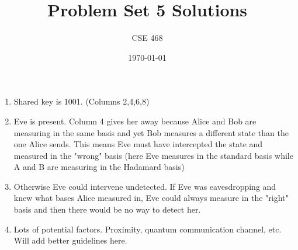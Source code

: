 \documentclass[12pt]{article}
\title{Problem Set 5 Solutions}
\author{CSE 468}
\date{\today}
\begin{document}
\maketitle

\begin{enumerate}[font=\bfseries]
    \item Shared key is 1001. (Columns 2,4,6,8)
    \item Eve is present. Column 4 gives her away because Alice and Bob are measuring in the same basis and yet Bob measures a different state than the one Alice sends. This means Eve must have intercepted the state and measured in the "wrong" basis (here Eve measures in the standard basis while A and B are measuring in the Hadamard basis)
    \item Otherwise Eve could intervene undetected. If Eve was eavesdropping and knew what bases Alice measured in, Eve could always measure in the "right" basis and then there would be no way to detect her.
    \item Lots of potential factors. Proximity, quantum communication channel, etc. Will add better guidelines here.

\end{enumerate}
\end{document}
